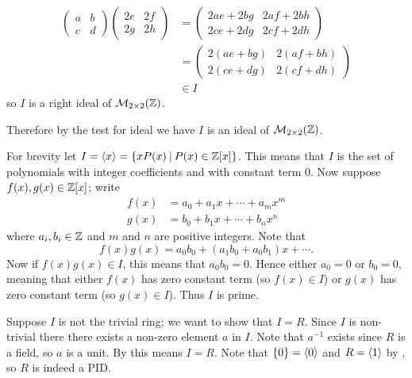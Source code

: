 \begin{questions}
\begin{itemize}
        \begin{align*}
            \begin{pmatrix}a&b\\c&d\end{pmatrix}\begin{pmatrix}2e&2f\\2g&2h\end{pmatrix} &= \begin{pmatrix}2ae+2bg&2af+2bh\\2ce+2dg&2cf+2dh\end{pmatrix}\\
            &= \begin{pmatrix}2(ae+bg)&2(af+bh)\\2(ce+dg)&2(cf+dh)\end{pmatrix}\\
            &\in I
        \end{align*}
        so $I$ is a right ideal of $\mathcal{M}_{2\times2}(\mathbb{Z})$.
    \end{itemize}
    Therefore by the test for ideal we have $I$ is an ideal of $\mathcal{M}_{2\times2}(\mathbb{Z})$.

    \item For brevity let $I = \princ{x} = \{xP(x) \vert P(x) \in \Z[x]\}$. This means that $I$ is the set of polynomials with integer coefficients and with constant term 0. Now suppose $f(x), g(x) \in \mathbb{Z}[x]$; write
    \begin{align*}
        f(x) &= a_0 + a_1x + \cdots + a_mx^m\\
        g(x) &= b_0 + b_1x + \cdots + b_nx^n
    \end{align*}
    where $a_i, b_i \in \mathbb{Z}$ and $m$ and $n$ are positive integers. Note that
    \[
        f(x)g(x) = a_0b_0 + (a_1b_0+a_0b_1)x + \cdots.
    \]
    Now if $f(x)g(x) \in I$, this means that $a_0b_0 = 0$. Hence either $a_0 = 0$ or $b_0 = 0$, meaning that either $f(x)$ has zero constant term (so $f(x) \in I$) or $g(x)$ has zero constant term (so $g(x) \in I$). Thus $I$ is prime.

    \item \begin{partquestions}{\alph*}
        \item Suppose $I$ is not the trivial ring; we want to show that $I = R$. Since $I$ is non-trivial there there exists a non-zero element $a$ in $I$. Note that $a^{-1}$ exists since $R$ is a field, so $a$ is a unit. By  this means $I = R$. Note that $\{0\} = \left\langle0\right\rangle$ and $R = \left\langle1\right\rangle$ by , so $R$ is indeed a PID.


\end{partquestions}
\end{questions}
